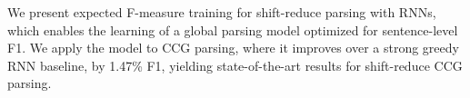 We present expected F-measure training for shift-reduce parsing with RNNs, which enables the learning of a global parsing model optimized for sentence-level F1. We apply the model to CCG parsing, where it improves over a strong greedy RNN baseline, by 1.47\% F1, yielding state-of-the-art results for shift-reduce CCG parsing.

